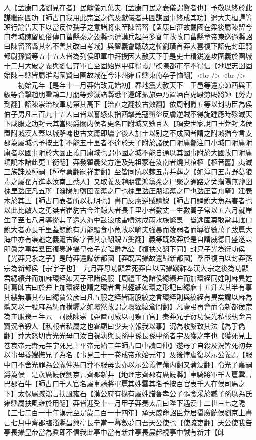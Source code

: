 人【孟康曰諸劉見在者】民獻儀九萬夫【孟康曰民之表儀謂賢者也】予敬以終於此謀繼嗣圖功【師古曰我用此宗室之儁及獻儀者共圖謀國事終成其功】遣大夫桓譚等班行諭告天下以當反位孺子之意諸將東至陳留菑【孟康曰菑故戴國在梁後屬陳留今曰考城陳留風俗傳曰菑縣秦之穀縣也遭漢兵起邑多菑年故改曰菑縣章帝東巡過縣詔曰陳留菑縣其名不善其改曰考城】與翟義會戰破之斬劉璜首莽大喜復下詔先封車騎都尉孫賢等五十五人皆為列侯即軍中拜授因大赦天下于是吏士精鋭遂攻圍義於圉城十二月大破之義與劉信弃軍亡至固始界中捕得義尸磔陳都市卒不得信【地理志圉固始陳三縣皆屬淮陽國賢曰圉故城在今汴州雍丘縣東南卒子恤翻】<br />
<br />
　　初始元年【是年十一月莽始改元始初】春地震大赦天下　王邑等還京師西與王級等合擊趙朋霍鴻二月朋等殄滅諸縣悉平還師振旅莽乃置酒白虎殿勞賜將帥【勞力到翻】詔陳崇治校軍功第其高下【治直之翻校古效翻】依周制爵五等以封功臣為侯伯子男凡三百九十五人曰皆以奮怒東指西擊羌寇蠻盜反虜逆賊不得旋踵應時殄滅天下咸服之功封云其當賜爵關内侯者更名曰附城又數百人【項安世家說曰王莽封諸侯置附城漢人蓋以城解墉也古文庸即墉字後人加土以别之不成國者謂之附城猶今言支郡為屬城也予按王制不能五十里者不達於天子附於諸侯曰附庸鄭注曰小城曰附庸附庸者以國事附於大國正義曰庸城也謂小國之城不能自通以其國事附於大國故曰附庸項說本諸此更工衡翻】莽發翟義父方進及先祖冢在汝南者燒其棺柩【柩音舊】夷滅三族誅及種嗣【種章勇翻嗣祥吏翻】至皆同阬以棘五毒并葬之【如淳曰五毒野葛狼毒之屬翟方進本汝南上蔡人】又取義及趙朋霍鴻黨衆之尸聚之通路之旁濮陽無鹽圉槐里盩厔凡五所【濮陽無鹽圉義黨之尸也槐里盩厔朋鴻黨之尸也盩厔音舟窒】建表木於其上【師古曰表者所以標明也】書曰反虜逆賊䲔鯢【師古曰䲔鯢大魚為害者也以此比敵人之勇桀者崔豹古今注鯨大者長千里小者數丈一生數萬子常以五六月就岸生子至七八月導從其子還大海中鼔浪成雷噴沫成雨水族驚畏一皆逃匿莫敢當其雌曰鯢大者亦長千里蓋鯨鯢有力能驅食小魚故以喻夫強暴而凌弱者而導從數萬子跋扈大海中亦有渠魁之義䲔古鯨字音其京翻鯢五奚翻】義等既敗莽於是自謂威德日盛遂謀即眞之事矣羣臣復奏進攝皇帝子安臨爵為公【復扶又翻下同】封兄子光為衍功侯【光莽兄永之子】是時莽還歸新都國【莽既居攝故還歸新都國】羣臣復白以封莽孫宗為新都侯【宗宇子也】　九月莽母功顯君死莽自以居攝踐祚奉漢大宗之後為功顯君緦縗弁而加麻環絰如天子弔諸侯服【周禮王為諸侯緦縗弁而加環絰同姓則麻異姓則葛師古曰於弁上加環絰也謂之環者言其輕細如環之形記曰緦麻十五升去其半有事其縷無事其布曰緦賈公彦曰凡五服之絰皆兩股絞之言環絰則與絞絰有異矣謂以麻為體又以一股麻為糾而横纒之如環然故謂之環絰縗倉囘翻】凡壹弔再會而令新都侯宗為主服喪三年云　司威陳崇【莽置司威以司察百官】奏莽兄子衍功侯光私報執金吾竇況令殺人【私報者私屬之也霍顯曰少夫幸報我以事】況為收繫致其法【為于偽翻】莽大怒切責光光母曰汝自視孰與長孫中孫長孫中孫者宇及獲之字也【獲死見上卷哀帝元夀元年宇死見上平帝元始三年師古曰中讀曰仲】遂母子自殺及況皆死初莽以事母養嫂撫兄子為名【事見三十一卷成帝永始元年】及後悖虐復以示公義焉【服中曰不舍光罪為公義仲馮曰莽不服母喪亦以示公義悖蒲内翻又蒲没翻】令光子嘉嗣爵為侯　是歲廣饒侯劉京言齊郡新井【地理志齊郡有廣饒縣】車騎將軍千人扈雲言巴郡石牛【師古曰千人官名屬車騎將軍扈其姓雲其名予按百官表千人在侯司馬之下】太保屬臧鴻言扶風雍石【漢公府有掾有屬姓譜魯孝公子彄食采於臧子孫以為氏雍縣屬扶風雍於用翻】莽皆迎受十一月甲子莽奏太后曰陛下遇漢十二世三七之阸【三七二百一十年漢元至是歲二百一十四年】承天威命詔臣莽居攝廣饒侯劉京上書言七月中齊郡臨淄縣昌興亭長辛當一暮數夢曰吾天公使也【使疏吏翻】天公使我告亭長攝皇帝當為眞即不信我此亭中當有新井亭長晨起視亭中誠有新井【師
